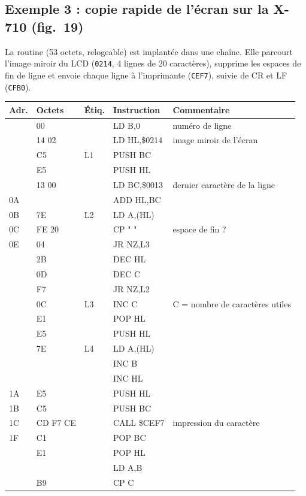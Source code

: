 \documentclass[a4paper,10pt]{article}
\makeatletter
\newcommand{\hex}[1]{\texttt{#1}}
\newenvironment{asm}
  {\small\begin{longtable}{@{}>{\ttfamily}l>{\ttfamily}l>{\ttfamily}l>{\ttfamily}l>{\raggedright\arraybackslash}p{6.2cm}@{}}
   \toprule
   \normalfont\bfseries Adr. & \normalfont\bfseries Octets & \normalfont\bfseries Étiq. & \normalfont\bfseries Instruction & \textbf{Commentaire}\\
   \midrule\endhead
   \bottomrule\endfoot}
  {\end{longtable}}
\makeatother
\begin{document}
\subsection*{Exemple 3 : copie rapide de l'écran sur la X-710 (fig.~19)}
La routine (53 octets, relogeable) est implantée dans une chaîne. Elle
parcourt l'image miroir du LCD (\hex{0214}, 4 lignes de 20 caractères),
supprime les espaces de fin de ligne et envoie chaque ligne à l'imprimante
(\hex{CEF7}), suivie de CR et LF (\hex{CFB0}).
\begin{asm}
00 & 06 00    & & LD B,0         & numéro de ligne \\
02 & 21 14 02 & & LD HL,\$0214   & image miroir de l'écran \\
05 & C5       & L1 & PUSH BC     & \\
06 & E5       & & PUSH HL        & \\
07 & 01 13 00 & & LD BC,\$0013   & dernier caractère de la ligne \\
0A & 09       & & ADD HL,BC      & \\
0B & 7E       & L2 & LD A,(HL)   & \\
0C & FE 20    & & CP " "         & espace de fin ? \\
0E & 20 04    & & JR NZ,L3       & \\
10 & 2B       & & DEC HL         & \\
11 & 0D       & & DEC C          & \\
12 & 20 F7    & & JR NZ,L2       & \\
14 & 0C       & L3 & INC C       & C = nombre de caractères utiles \\
15 & E1       & & POP HL         & \\
16 & E5       & & PUSH HL        & \\
17 & 7E       & L4 & LD A,(HL)   & \\
18 & 04       & & INC B          & \\
19 & 23       & & INC HL         & \\
1A & E5       & & PUSH HL        & \\
1B & C5       & & PUSH BC        & \\
1C & CD F7 CE & & CALL \$CEF7    & impression du caractère \\
1F & C1       & & POP BC         & \\
20 & E1       & & POP HL         & \\
21 & 78       & & LD A,B         & \\
22 & B9       & & CP C           & \\

\end{asm}
\end{document}
